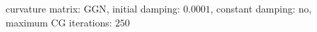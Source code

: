 curvature matrix: $\text{GGN}$, initial damping: $\num[scientific-notation=true]{0.0001}$, constant damping: $\text{no}$, maximum CG iterations: $\num[scientific-notation=false]{250}$